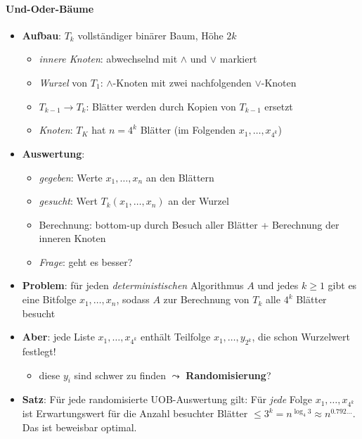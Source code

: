 \paragraph{Und-Oder-Bäume}
\begin{itemize}
  \item \textbf{Aufbau}: $ T_k $ vollständiger binärer Baum, Höhe $ 2k $
  \begin{itemize}
    \item \emph{innere Knoten}: abwechselnd mit $ \wedge $ und $ \vee $ markiert
    \item \emph{Wurzel} von $ T_1 $: $ \wedge $-Knoten mit zwei nachfolgenden $ \vee $-Knoten
    \item $ T_{k-1} \to T_k $: Blätter werden durch Kopien von $ T_{k-1} $ ersetzt
    \item \emph{Knoten}: $ T_K $ hat $ n = 4^k $ Blätter (im Folgenden $ x_1, \dots, x_{4^k} $)
  \end{itemize}
  \item \textbf{Auswertung}:
  \begin{itemize}
    \item \emph{gegeben}: Werte $ x_1, \dots, x_n $ an den Blättern
    \item \emph{gesucht}: Wert $ T_k(x_1, \dots, x_n) $ an der Wurzel
    \item Berechnung: bottom-up durch Besuch aller Blätter + Berechnung der inneren Knoten
    \item \emph{Frage}: geht es besser?
  \end{itemize}
  \item \textbf{Problem}: für jeden \emph{deterministischen} Algorithmus $ A $ und jedes $ k \geq 1 $ gibt es eine Bitfolge $ x_1, \dots, x_n $, sodass $ A $ zur Berechnung von $ T_k $ alle $ 4^k $ Blätter besucht
  \item \textbf{Aber}: jede Liste $ x_1, \dots, x_{4^k} $ enthält Teilfolge $ x_1, \dots, y_{2^k} $, die schon Wurzelwert festlegt!
  \begin{itemize}
    \item diese $ y_i $ sind schwer zu finden $ \leadsto $ \textbf{Randomisierung}?
  \end{itemize}
  \item \textbf{Satz}: Für jede randomisierte UOB-Auswertung gilt: Für \emph{jede} Folge $ x_1, \dots, x_{4^k} $ ist Erwartungswert für die Anzahl besuchter Blätter $ \leq 3^k = n^{\log_4 3} \approx n^{0.792\dots} $. Das ist beweisbar optimal.
\end{itemize}

